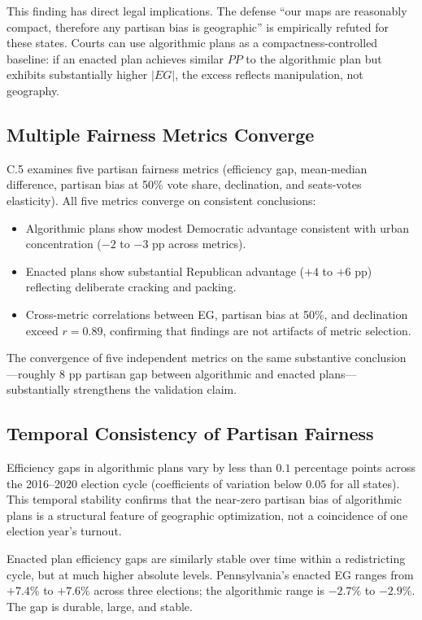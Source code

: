 This finding has direct legal implications. The defense ``our maps
are reasonably compact, therefore any partisan bias is geographic''
is empirically refuted for these states. Courts can use algorithmic
plans as a compactness-controlled baseline: if an enacted plan achieves
similar $PP$ to the algorithmic plan but exhibits substantially higher
$|EG|$, the excess reflects manipulation, not geography.

\subsection{Multiple Fairness Metrics Converge}

C.5 examines five partisan fairness metrics (efficiency gap,
mean-median difference, partisan bias at 50\% vote share, declination,
and seats-votes elasticity). All five metrics converge on consistent
conclusions:

\begin{itemize}
  \item Algorithmic plans show modest Democratic advantage consistent
    with urban concentration ($-2$ to $-3$ pp across metrics).
  \item Enacted plans show substantial Republican advantage ($+4$ to
    $+6$ pp) reflecting deliberate cracking and packing.
  \item Cross-metric correlations between EG, partisan bias at 50\%,
    and declination exceed $r = 0.89$, confirming that findings are
    not artifacts of metric selection.
\end{itemize}

The convergence of five independent metrics on the same substantive
conclusion---roughly $8$ pp partisan gap between algorithmic and
enacted plans---substantially strengthens the validation claim.

\subsection{Temporal Consistency of Partisan Fairness}

Efficiency gaps in algorithmic plans vary by less than $0.1$ percentage
points across the 2016--2020 election cycle (coefficients of variation
below $0.05$ for all states). This temporal stability confirms that
the near-zero partisan bias of algorithmic plans is a structural
feature of geographic optimization, not a coincidence of one election
year's turnout.

Enacted plan efficiency gaps are similarly stable over time within a
redistricting cycle, but at much higher absolute levels. Pennsylvania's
enacted EG ranges from $+7.4\%$ to $+7.6\%$ across three elections;
the algorithmic range is $-2.7\%$ to $-2.9\%$. The gap is durable,
large, and stable.

